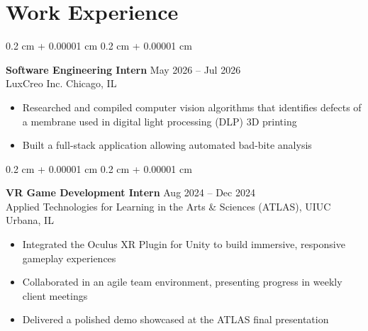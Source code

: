 \documentclass[10pt, letterpaper]{article}
\newenvironment{highlights}{
    \vspace*{2.5 pt}
    \begin{itemize}[
        topsep=0 cm,
        parsep=0 cm,
        partopsep=0pt,
        itemsep=2.5 pt,
        leftmargin=0.4 cm + 10pt
    ]
}{
    \end{itemize}
} %
\newenvironment{onecolentry}{
    \begin{adjustwidth}{
        0.2 cm + 0.00001 cm
    }{
        0.2 cm + 0.00001 cm
    }
}{
    \end{adjustwidth}
} %
\begin{document}
        \vspace{0.3 cm}


    \section{Work Experience}

        \begin{onecolentry}
            \textbf{Software Engineering Intern} \hfill May 2026 -- Jul 2026 \\
            {LuxCreo Inc.} \hfill {Chicago, IL}

            \begin{highlights}
                \item Researched and compiled computer vision algorithms that identifies defects of a membrane used in digital light processing (DLP) 3D printing
                \item Built a full-stack application allowing automated bad-bite analysis
            \end{highlights}
        \end{onecolentry}

        \vspace{0.3 cm}
    
        \begin{onecolentry}
            \textbf{VR Game Development Intern} \hfill Aug 2024 -- Dec 2024 \\
            {Applied Technologies for Learning in the Arts \& Sciences (ATLAS), UIUC} \hfill {Urbana, IL}

            \begin{highlights}
                \item Integrated the Oculus XR Plugin for Unity to build immersive, responsive gameplay experiences
                \item Collaborated in an agile team environment, presenting progress in weekly client meetings
                \item Delivered a polished demo showcased at the ATLAS final presentation
            \end{highlights}
        \end{onecolentry}

        \vspace{0.3 cm}

        
\end{document}
